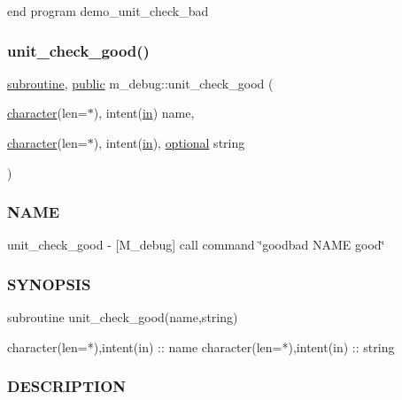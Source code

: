 end program demo\+\_\+unit\+\_\+check\+\_\+bad \mbox{\label{namespacem__debug_acd67428a8900ec4c36bd3a7b28d56987}} 
\subsubsection{\texorpdfstring{unit\+\_\+check\+\_\+good()}{unit\_check\_good()}}
{\footnotesize\ttfamily \hyperlink{M__stopwatch_83_8txt_acfbcff50169d691ff02d4a123ed70482}{subroutine}, \hyperlink{M__stopwatch_83_8txt_a2f74811300c361e53b430611a7d1769f}{public} m\+\_\+debug\+::unit\+\_\+check\+\_\+good (\begin{DoxyParamCaption}\item[{\hyperlink{option__stopwatch_83_8txt_abd4b21fbbd175834027b5224bfe97e66}{character}(len=$\ast$), intent(\hyperlink{M__journal_83_8txt_afce72651d1eed785a2132bee863b2f38}{in})}]{name,  }\item[{\hyperlink{option__stopwatch_83_8txt_abd4b21fbbd175834027b5224bfe97e66}{character}(len=$\ast$), intent(\hyperlink{M__journal_83_8txt_afce72651d1eed785a2132bee863b2f38}{in}), \hyperlink{option__stopwatch_83_8txt_aa4ece75e7acf58a4843f70fe18c3ade5}{optional}}]{string }\end{DoxyParamCaption})}



\subsubsection*{N\+A\+ME}

unit\+\_\+check\+\_\+good -\/ \mbox{[}M\+\_\+debug\mbox{]} call command \char`\"{}goodbad N\+A\+M\+E good\char`\"{} 

\subsubsection*{S\+Y\+N\+O\+P\+S\+IS}

\begin{DoxyVerb}subroutine unit_check_good(name,string)

 character(len=*),intent(in) :: name
 character(len=*),intent(in) :: string
\end{DoxyVerb}


\subsubsection*{D\+E\+S\+C\+R\+I\+P\+T\+I\+ON}

